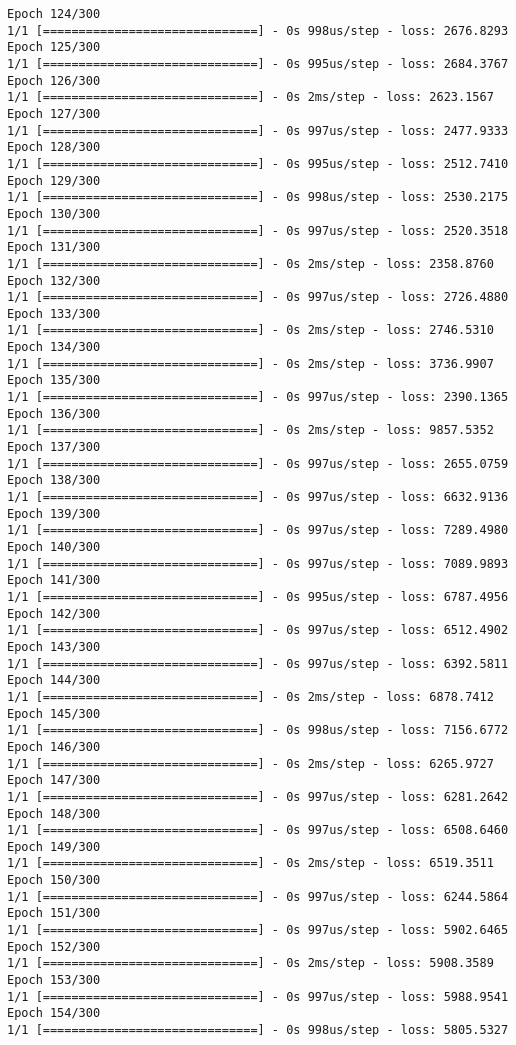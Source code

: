 \documentclass[11pt]{article}
\begin{document}
\begin{Verbatim}[commandchars=\\\{\}]
Epoch 124/300
1/1 [==============================] - 0s 998us/step - loss: 2676.8293
Epoch 125/300
1/1 [==============================] - 0s 995us/step - loss: 2684.3767
Epoch 126/300
1/1 [==============================] - 0s 2ms/step - loss: 2623.1567
Epoch 127/300
1/1 [==============================] - 0s 997us/step - loss: 2477.9333
Epoch 128/300
1/1 [==============================] - 0s 995us/step - loss: 2512.7410
Epoch 129/300
1/1 [==============================] - 0s 998us/step - loss: 2530.2175
Epoch 130/300
1/1 [==============================] - 0s 997us/step - loss: 2520.3518
Epoch 131/300
1/1 [==============================] - 0s 2ms/step - loss: 2358.8760
Epoch 132/300
1/1 [==============================] - 0s 997us/step - loss: 2726.4880
Epoch 133/300
1/1 [==============================] - 0s 2ms/step - loss: 2746.5310
Epoch 134/300
1/1 [==============================] - 0s 2ms/step - loss: 3736.9907
Epoch 135/300
1/1 [==============================] - 0s 997us/step - loss: 2390.1365
Epoch 136/300
1/1 [==============================] - 0s 2ms/step - loss: 9857.5352
Epoch 137/300
1/1 [==============================] - 0s 997us/step - loss: 2655.0759
Epoch 138/300
1/1 [==============================] - 0s 997us/step - loss: 6632.9136
Epoch 139/300
1/1 [==============================] - 0s 997us/step - loss: 7289.4980
Epoch 140/300
1/1 [==============================] - 0s 997us/step - loss: 7089.9893
Epoch 141/300
1/1 [==============================] - 0s 995us/step - loss: 6787.4956
Epoch 142/300
1/1 [==============================] - 0s 997us/step - loss: 6512.4902
Epoch 143/300
1/1 [==============================] - 0s 997us/step - loss: 6392.5811
Epoch 144/300
1/1 [==============================] - 0s 2ms/step - loss: 6878.7412
Epoch 145/300
1/1 [==============================] - 0s 998us/step - loss: 7156.6772
Epoch 146/300
1/1 [==============================] - 0s 2ms/step - loss: 6265.9727
Epoch 147/300
1/1 [==============================] - 0s 997us/step - loss: 6281.2642
Epoch 148/300
1/1 [==============================] - 0s 997us/step - loss: 6508.6460
Epoch 149/300
1/1 [==============================] - 0s 2ms/step - loss: 6519.3511
Epoch 150/300
1/1 [==============================] - 0s 997us/step - loss: 6244.5864
Epoch 151/300
1/1 [==============================] - 0s 997us/step - loss: 5902.6465
Epoch 152/300
1/1 [==============================] - 0s 2ms/step - loss: 5908.3589
Epoch 153/300
1/1 [==============================] - 0s 997us/step - loss: 5988.9541
Epoch 154/300
1/1 [==============================] - 0s 998us/step - loss: 5805.5327

\end{Verbatim}
\end{document}
